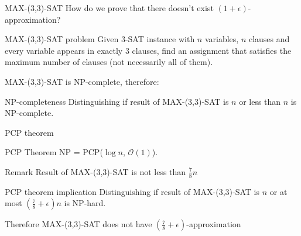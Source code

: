 \documentclass{beamer}
\begin{document}
\begin{frame}{\textsc{MAX-(3,3)-SAT}}
How do we prove that there doesn't exist $(1+\epsilon)$-approximation?


\begin{block}{\textsc{MAX-(3,3)-SAT} problem}
Given 3-SAT instance with $n$ variables, $n$ clauses
and every variable appears in exactly 3 clauses,
find an assignment
that satisfies the maximum number of clauses
(not necessarily all of them).
\end{block}

MAX-(3,3)-SAT is NP-complete, therefore:

\begin{block}{NP-completeness}
Distinguishing if result of MAX-(3,3)-SAT is
$n$ or less than $n$ is NP-complete.
\end{block}
\end{frame}

\begin{frame}{PCP theorem}
\begin{block}{PCP Theorem}
NP = PCP($\log n$, $\mathcal{O}(1)$).
\end{block}

\begin{block}{Remark}
Result of MAX-(3,3)-SAT is not less than $\frac{7}{8}n$
\end{block}

\begin{block}{PCP theorem implication}
Distinguishing if result of MAX-(3,3)-SAT is $n$
or at most $(\frac{7}{8} + \epsilon)n$ is NP-hard.
\end{block}

Therefore MAX-(3,3)-SAT does not have
$(\frac{7}{8}+\epsilon)$-approximation
\end{frame}
\end{document}
